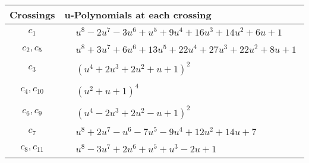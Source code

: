 \documentclass[1p]{elsarticle_modified}
\theoremstyle{definition}
\begin{document}
\begin{tabular}{m{50pt}|m{274pt}}
Crossings & \hspace{64pt}u-Polynomials at each crossing \\
\hline $$\begin{aligned}c_{1}\end{aligned}$$&$\begin{aligned}
&u^8-2 u^7-3 u^6+u^5+9 u^4+16 u^3+14 u^2+6 u+1
\end{aligned}$\\
\hline $$\begin{aligned}c_{2},c_{5}\end{aligned}$$&$\begin{aligned}
&u^8+3 u^7+6 u^6+13 u^5+22 u^4+27 u^3+22 u^2+8 u+1
\end{aligned}$\\
\hline $$\begin{aligned}c_{3}\end{aligned}$$&$\begin{aligned}
&(u^4+2 u^3+2 u^2+u+1)^2
\end{aligned}$\\
\hline $$\begin{aligned}c_{4},c_{10}\end{aligned}$$&$\begin{aligned}
&(u^2+u+1)^4
\end{aligned}$\\
\hline $$\begin{aligned}c_{6},c_{9}\end{aligned}$$&$\begin{aligned}
&(u^4-2 u^3+2 u^2- u+1)^2
\end{aligned}$\\
\hline $$\begin{aligned}c_{7}\end{aligned}$$&$\begin{aligned}
&u^8+2 u^7- u^6-7 u^5-9 u^4+12 u^2+14 u+7
\end{aligned}$\\
\hline $$\begin{aligned}c_{8},c_{11}\end{aligned}$$&$\begin{aligned}
&u^8-3 u^7+2 u^6+u^5+u^3-2 u+1
\end{aligned}$\\
\hline
\end{tabular}\\~\\
\newpage\renewcommand{\arraystretch}{1}
\end{document}
